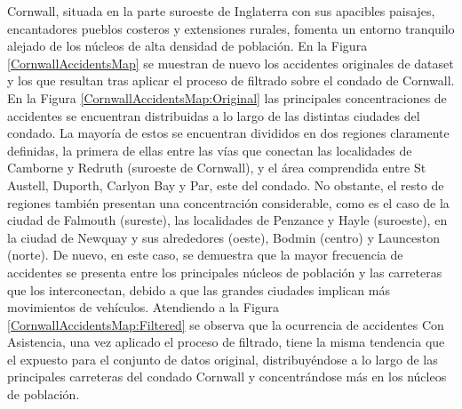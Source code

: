 \documentclass{uathesis-es}
\begin{document}
{Cornwall, situada en la parte suroeste de Inglaterra con sus apacibles paisajes, encantadores pueblos costeros y extensiones rurales, fomenta un entorno tranquilo alejado de los núcleos de alta densidad de población. En la Figura \ref{CornwallAccidentsMap} se muestran de nuevo los accidentes originales de dataset y los que resultan tras aplicar el proceso de filtrado sobre el condado de Cornwall. En la Figura \ref{CornwallAccidentsMap:Original} las principales concentraciones de accidentes se encuentran distribuidas a lo largo de las distintas ciudades del condado. La mayoría de estos se encuentran divididos en dos regiones claramente definidas, la primera de ellas entre las vías que conectan las localidades de Camborne y Redruth (suroeste de Cornwall), y el área comprendida entre St Austell, Duporth, Carlyon Bay y Par, este del condado. No obstante, el resto de regiones también presentan una concentración considerable, como es el caso de la ciudad de Falmouth (sureste), las localidades de Penzance y Hayle (suroeste), en la ciudad de Newquay y sus alrededores (oeste), Bodmin (centro) y Launceston (norte). De nuevo, en este caso, se demuestra que la mayor frecuencia de accidentes se presenta entre los principales núcleos de población y las carreteras que los interconectan, debido a que las grandes ciudades implican más movimientos de vehículos. Atendiendo a la Figura \ref{CornwallAccidentsMap:Filtered} se observa que la ocurrencia de accidentes Con Asistencia, una vez aplicado el proceso de filtrado, tiene la misma tendencia que el expuesto para el conjunto de datos original, distribuyéndose a lo largo de las principales carreteras del condado Cornwall y concentrándose más en los núcleos de población.



}
\end{document}
